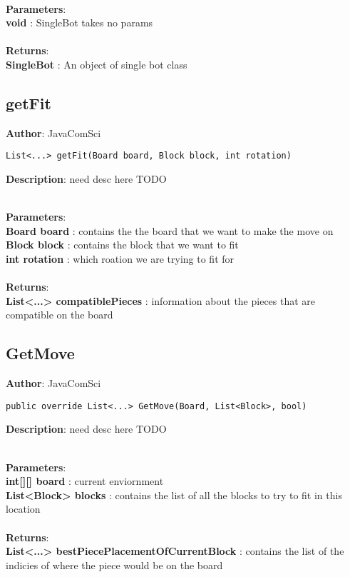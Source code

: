 \documentclass[12pt]{article}
\begin{document}
\textbf{\large{\\Parameters}}:\\
\textbf{void }: SingleBot takes no params\\\textbf{\large{\\Returns}}:\\
\textbf{SingleBot }: An object of single bot class\\

\subsection{getFit}
\textbf{Author}: JavaComSci 
\vspace*{1\baselineskip}
\begin{lstlisting}
List<...> getFit(Board board, Block block, int rotation)
\end{lstlisting} 
\vspace*{1\baselineskip}
\textbf{Description}: need desc here TODO 


\textbf{\large{\\Parameters}}:\\
\textbf{Board board }: contains the the board that we want to make the move on\\
\textbf{Block block }: contains the block that we want to fit\\
\textbf{int rotation }: which roation we are trying to fit for\\\textbf{\large{\\Returns}}:\\
\textbf{List<...> compatiblePieces }: information about the pieces that are compatible on the board\\

\subsection{GetMove}
\textbf{Author}: JavaComSci 
\vspace*{1\baselineskip}
\begin{lstlisting}
public override List<...> GetMove(Board, List<Block>, bool)
\end{lstlisting} 
\vspace*{1\baselineskip}
\textbf{Description}: need desc here TODO 


\textbf{\large{\\Parameters}}:\\
\textbf{int[][] board }: current enviornment\\
\textbf{List<Block> blocks }: contains the list of all the blocks to try to fit in this location\\\textbf{\large{\\Returns}}:\\
\textbf{List<...> bestPiecePlacementOfCurrentBlock }: contains the list of the indicies of where the piece would be on the board\\
\end{document}
